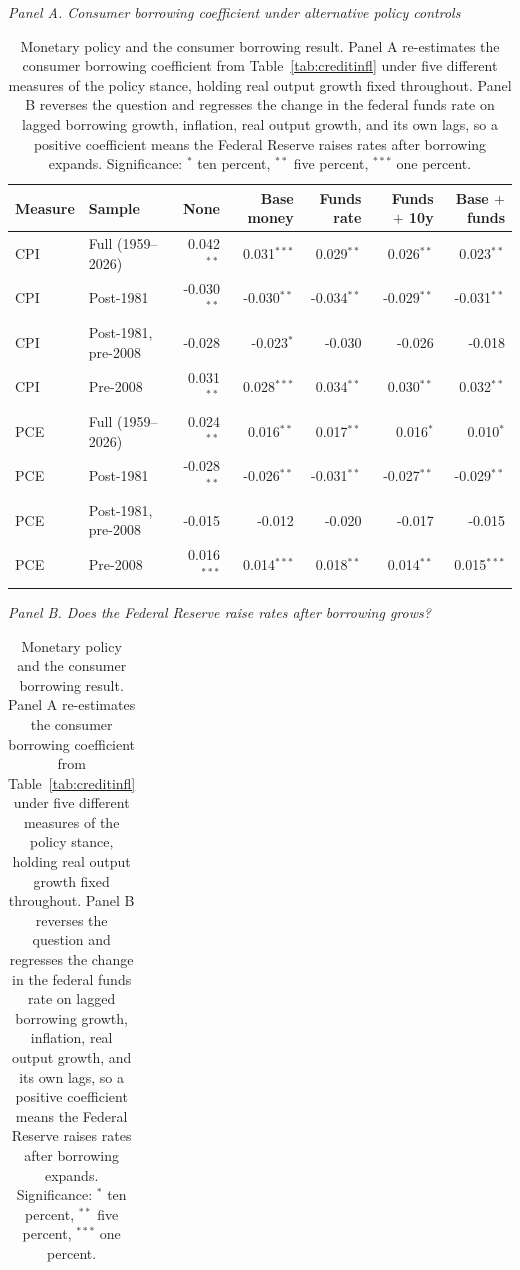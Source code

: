 \begin{table}[htbp]
\centering
\setlength{\belowcaptionskip}{8pt}
\footnotesize
\setlength{\tabcolsep}{4pt}
\caption{Monetary policy and the consumer borrowing result. Panel A re-estimates the consumer borrowing coefficient from Table~\ref{tab:creditinfl} under five different measures of the policy stance, holding real output growth fixed throughout. Panel B reverses the question and regresses the change in the federal funds rate on lagged borrowing growth, inflation, real output growth, and its own lags, so a positive coefficient means the Federal Reserve raises rates after borrowing expands. Significance: $^{*}$ ten percent, $^{**}$ five percent, $^{***}$ one percent.}
\label{tab:policyresp}
\textit{Panel A. Consumer borrowing coefficient under alternative policy controls}\par\vspace{2pt}
\begin{tabular}{llrrrrr}
\toprule
Measure & Sample & None & Base money & Funds rate & Funds $+$ 10y & Base $+$ funds \\
\midrule
CPI & Full (1959--2026) & 0.042$^{**}$ & 0.031$^{***}$ & 0.029$^{**}$ & 0.026$^{**}$ & 0.023$^{**}$ \\
CPI & Post-1981 & -0.030$^{**}$ & -0.030$^{**}$ & -0.034$^{**}$ & -0.029$^{**}$ & -0.031$^{**}$ \\
CPI & Post-1981, pre-2008 & -0.028 & -0.023$^{*}$ & -0.030 & -0.026 & -0.018 \\
CPI & Pre-2008 & 0.031$^{**}$ & 0.028$^{***}$ & 0.034$^{**}$ & 0.030$^{**}$ & 0.032$^{**}$ \\
PCE & Full (1959--2026) & 0.024$^{**}$ & 0.016$^{**}$ & 0.017$^{**}$ & 0.016$^{*}$ & 0.010$^{*}$ \\
PCE & Post-1981 & -0.028$^{**}$ & -0.026$^{**}$ & -0.031$^{**}$ & -0.027$^{**}$ & -0.029$^{**}$ \\
PCE & Post-1981, pre-2008 & -0.015 & -0.012 & -0.020 & -0.017 & -0.015 \\
PCE & Pre-2008 & 0.016$^{***}$ & 0.014$^{***}$ & 0.018$^{**}$ & 0.014$^{**}$ & 0.015$^{***}$ \\
\bottomrule
\end{tabular}
\par\vspace{10pt}
\textit{Panel B. Does the Federal Reserve raise rates after borrowing grows?}\par\vspace{2pt}
\begin{tabular}{llrrrrr}
\toprule

\end{tabular}
\end{table}
